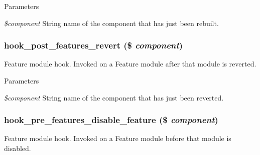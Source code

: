 \begin{DoxyParams}{Parameters}
\item[{\em \$component}]String name of the component that has just been rebuilt. \end{DoxyParams}
\hypertarget{group__features__module__hooks_ga07210a0c5a329f85a59721ab646b1c6e}{
\subsubsection[{hook\_\-post\_\-features\_\-revert}]{\setlength{\rightskip}{0pt plus 5cm}hook\_\-post\_\-features\_\-revert (\$ {\em component})}}
\label{group__features__module__hooks_ga07210a0c5a329f85a59721ab646b1c6e}
Feature module hook. Invoked on a Feature module after that module is reverted.


\begin{DoxyParams}{Parameters}
\item[{\em \$component}]String name of the component that has just been reverted. \end{DoxyParams}
\hypertarget{group__features__module__hooks_ga506df36825e0deb9a42e8d03e522ee27}{
\subsubsection[{hook\_\-pre\_\-features\_\-disable\_\-feature}]{\setlength{\rightskip}{0pt plus 5cm}hook\_\-pre\_\-features\_\-disable\_\-feature (\$ {\em component})}}
\label{group__features__module__hooks_ga506df36825e0deb9a42e8d03e522ee27}
Feature module hook. Invoked on a Feature module before that module is disabled.


